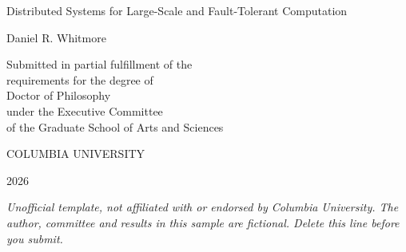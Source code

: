 \begin{titlepage}
\centering
\vspace*{1in}
Distributed Systems for Large-Scale and Fault-Tolerant Computation\par
\vspace{0.4in}
Daniel R. Whitmore\par
\vfill
\begin{singlespace}
Submitted in partial fulfillment of the\\
requirements for the degree of\\
Doctor of Philosophy\\
under the Executive Committee\\
of the Graduate School of Arts and Sciences\par
\vspace{0.4in}
COLUMBIA UNIVERSITY\par
\vspace{0.3in}
2026
\end{singlespace}
\vspace{0.6in}
{\footnotesize\itshape Unofficial template, not affiliated with or endorsed by Columbia University. The author, committee and results in this sample are fictional. Delete this line before you submit.}
\end{titlepage}
